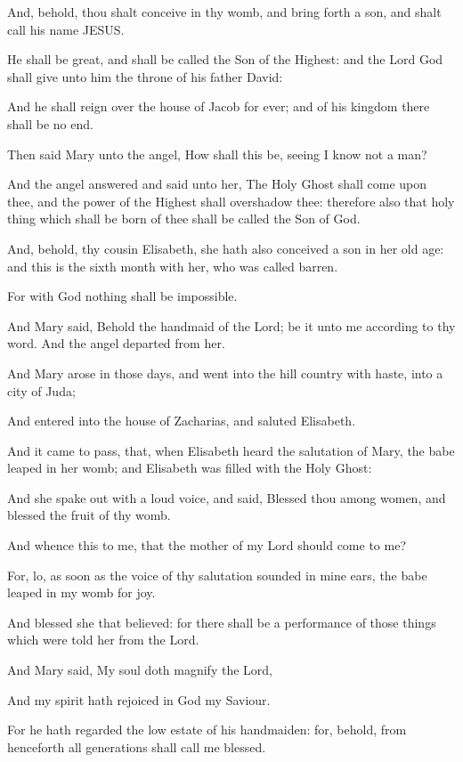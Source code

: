 {And,
behold, thou shalt
conceive
in thy
womb,
and bring
forth a
son,
and shalt
call
his
name
JESUS.

He shall
be
great,
and shall be
called the
Son of the
Highest:
and the
Lord
God shall
give unto
him the
throne
of
his
father
David:

And he shall
reign
over the
house of
Jacob
for
ever;
and
of
his
kingdom there shall
be
no
end.

Then
said
Mary
unto the
angel,
How
shall
this
be,
seeing I
know
not a
man?

And the
angel
answered and
said unto
her, The
Holy
Ghost shall
come
upon
thee,
and the
power of the
Highest shall
overshadow
thee:
therefore
also that holy
thing which shall be born of
thee shall be
called the
Son of
God.

And,
behold,
thy
cousin
Elisabeth,
she
hath
also
conceived a
son
in
her old
age:
and
this
is the
sixth
month with
her, who was
called
barren.

For
with
God
nothing shall be
impossible.

And
Mary
said,
Behold the
handmaid of the
Lord; be
it unto
me according
to
thy
word.
And the
angel
departed
from
her.

And
Mary
arose
in
those
days, and
went
into the hill
country
with
haste,
into a
city of
Juda;

And
entered
into the
house of
Zacharias,
and
saluted
Elisabeth.

And it came to
pass, that,
when
Elisabeth
heard the
salutation of
Mary, the
babe
leaped
in
her
womb;
and
Elisabeth was
filled with
the
Holy
Ghost:

And she spake
out with
a
loud
voice,
and
said,
Blessed
{}
thou
among
women,
and
blessed
{} the
fruit
of
thy
womb.

And
whence
{}
this to
me,
that the
mother
of
my
Lord should
come
to
me?

For,
lo, as soon
as the
voice
of
thy
salutation
sounded
in
mine
ears, the
babe
leaped
in
my
womb
for
joy.

And
blessed
{} she that
believed:
for there shall
be a
performance of those things which were
told
her
from the
Lord.

And
Mary
said,
My
soul doth
magnify the
Lord,

And
my
spirit hath
rejoiced
in
God
my
Saviour.

For he hath
regarded the low
estate
of
his
handmaiden:
for,
behold,
from
henceforth
all
generations shall
call
me
blessed.

}
